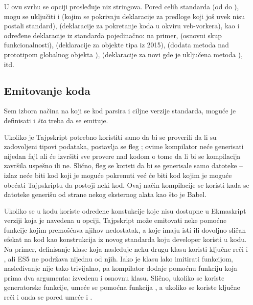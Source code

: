 U ovu svrhu se opciji  prosleđuje niz stringova.
Pored celih standarda (od  do ), mogu se uključiti i  (kojim se pokrivaju deklaracije za predloge koji još uvek nisu postali standard),  (deklaracije za pokretanje koda u okviru veb-vorkera), kao i određene deklaracije iz standard\=a pojedinačno: na primer,  (osnovni skup funkcionalnosti),  (deklaracije za objekte tipa  iz 2015),  (dodata metoda  nad prototipom globalnog objekta ),  (deklaracije za novi  gde je uključena metoda ), itd.

\subsection{Emitovanje koda}

Sem izbora načina na koji se kod parsira i ciljne verzije standarda, moguće je definisati i \textit{šta} treba da se emituje.

Ukoliko je Tajpskript potrebno koristiti samo da bi se proverili da li su zadovoljeni tipovi podataka, postavlja se fleg ; ovime kompilator neće generisati nijedan fajl ali će izvršiti sve provere nad kodom o tome da li bi se kompilacija završila uspešno ili ne.
Slično, fleg  se koristi da bi se generisale samo  datoteke -- izlaz neće biti kod koji je moguće pokrenuti već će biti kod kojim je moguće obećati Tajpskriptu da postoji neki kod.
Ovaj način kompilacije se koristi kada se  datoteke generišu od strane nekog eksternog alata kao što je Babel.

Ukoliko se u kodu koriste određene konstukcije koje nisu dostupne u Ekmaskript verziji koja je navedena u  opciji, Tajpskript može emitovati neke pomoćne funkcije kojim premošćava njihov nedostatak, a koje imaju isti ili dovoljno sličan efekat na kod kao konstrukcija iz novog standarda koju developer koristi u kodu.
Na primer, definisanje klase koja nasleđuje neku drugu klasu koristi ključne reči  i , ali ES5 ne podržava nijednu od njih.
Iako je klasu lako imitirati funkcijom, nasleđivanje nije tako trivijalno, pa kompilator dodaje pomoćnu funkciju  koja prima dva argumenta: izvedenu i osnovnu klasu.
Slično, ukoliko se koriste generatorske funkcije, umeće se pomoćna funkcija , a ukoliko se koriste ključne reči  i  onda se pored  umeće i .

